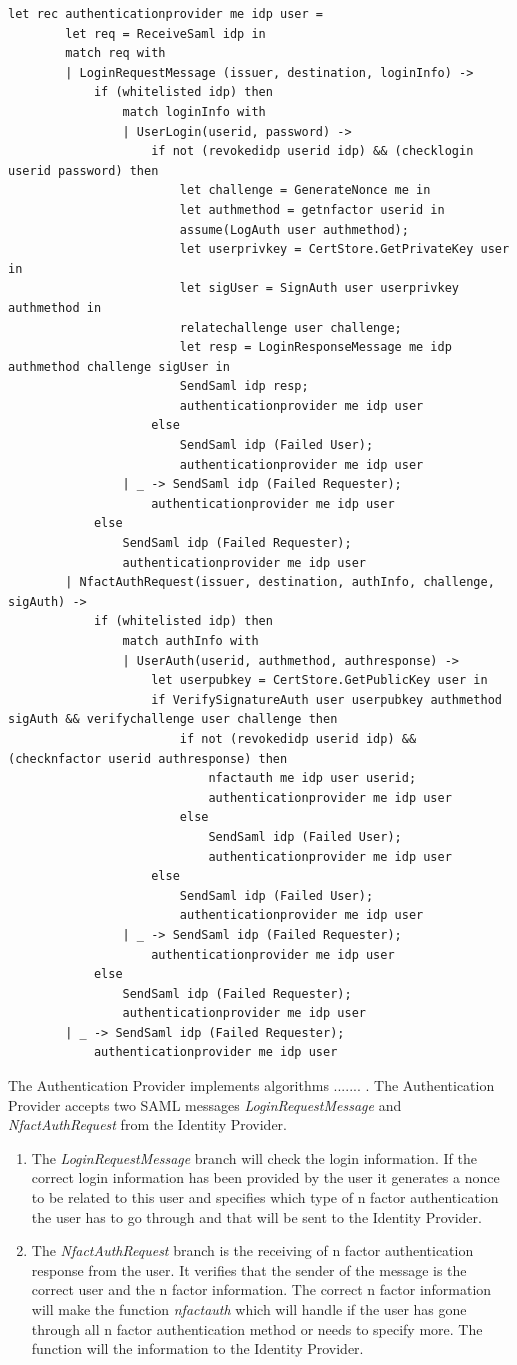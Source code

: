 \documentclass[twosided]{report}
\begin{document}
\begin{lstlisting}[style=fstar, caption={Specification of the authentication provider}]
	let rec authenticationprovider me idp user =
		let req = ReceiveSaml idp in
		match req with
		| LoginRequestMessage (issuer, destination, loginInfo) ->
			if (whitelisted idp) then
				match loginInfo with
				| UserLogin(userid, password) ->
					if not (revokedidp userid idp) && (checklogin userid password) then
						let challenge = GenerateNonce me in
						let authmethod = getnfactor userid in
						assume(LogAuth user authmethod);
						let userprivkey = CertStore.GetPrivateKey user in
						let sigUser = SignAuth user userprivkey authmethod in
						relatechallenge user challenge;
						let resp = LoginResponseMessage me idp authmethod challenge sigUser in
						SendSaml idp resp;
						authenticationprovider me idp user
					else
						SendSaml idp (Failed User);
						authenticationprovider me idp user
				| _ -> SendSaml idp (Failed Requester);
					authenticationprovider me idp user
			else
				SendSaml idp (Failed Requester);
				authenticationprovider me idp user
		| NfactAuthRequest(issuer, destination, authInfo, challenge, sigAuth) ->
			if (whitelisted idp) then
				match authInfo with
				| UserAuth(userid, authmethod, authresponse) ->
					let userpubkey = CertStore.GetPublicKey user in
					if VerifySignatureAuth user userpubkey authmethod sigAuth && verifychallenge user challenge then
						if not (revokedidp userid idp) && (checknfactor userid authresponse) then
							nfactauth me idp user userid;
							authenticationprovider me idp user
						else
							SendSaml idp (Failed User);
							authenticationprovider me idp user
					else
						SendSaml idp (Failed User);
						authenticationprovider me idp user
				| _ -> SendSaml idp (Failed Requester);
					authenticationprovider me idp user
			else
				SendSaml idp (Failed Requester);
				authenticationprovider me idp user
		| _ -> SendSaml idp (Failed Requester);
			authenticationprovider me idp user
\end{lstlisting}
The Authentication Provider implements algorithms ....... . The Authentication Provider accepts two SAML messages \emph{LoginRequestMessage} and \emph{NfactAuthRequest} from the Identity Provider.
\begin{enumerate}
\item The \emph{LoginRequestMessage} branch will check the login information. If the correct login information has been provided by the user it generates a nonce to be related to this user and specifies which type of n factor authentication the user has to go through and that will be sent to the Identity Provider.
\item The \emph{NfactAuthRequest} branch is the receiving of n factor authentication response from the user. It verifies that the sender of the message is the correct user and the n factor information. The correct n factor information will make the function \emph{nfactauth} which will handle if the user has gone through all n factor authentication method or needs to specify more. The function will the information to the Identity Provider.
\end{enumerate}
\end{document}
